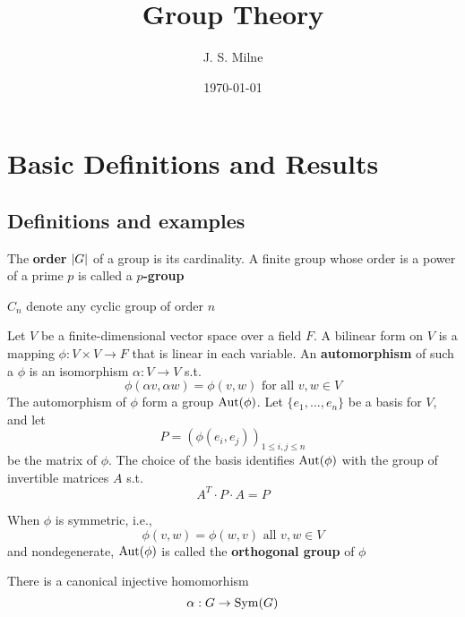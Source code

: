 \documentclass[11pt]{article}
\author{J. S. Milne}
\date{\today}
\title{Group Theory}
\begin{document}
\maketitle
\tableofcontents

\section{Basic Definitions and Results}
\label{sec:org7e895c4}
\subsection{Definitions and examples}
\label{sec:orgc0d5906}
The \textbf{order} \(\abs{G}\) of a group is its cardinality. A finite group whose order is a power of a
prime \(p\) is called a \textbf{\(p\)-group}

\(C_n\) denote any cyclic group of order \(n\)

\begin{examplle}[]
Let \(V\) be a finite-dimensional vector space over a field \(F\). A bilinear form on \(V\) is a
mapping \(\phi:V\times V\to F\) that is linear in each variable. An \textbf{automorphism} of such a \(\phi\) is an
isomorphism \(\alpha:V\to V\) s.t.
\begin{equation*}
\phi(\alpha v,\alpha w)=\phi(v,w)\text{ for all }v,w\in V
\end{equation*}
The automorphism of \(\phi\) form a group \(\operatorname{\text{Aut}}(\phi)\). Let \(\{e_1,\dots,e_n\}\) be a basis for \(V\), and let
\begin{equation*}
P=(\phi(e_i,e_j))_{1\le i,j\le n}
\end{equation*}
be the matrix of \(\phi\). The choice of the basis identifies \(\operatorname{\text{Aut}}(\phi)\) with the group of invertible
matrices \(A\) s.t.
\begin{equation*}
A^T\cdot P\cdot A=P
\end{equation*}

When \(\phi\) is symmetric, i.e.,
\begin{equation*}
\phi(v,w)=\phi(w,v)\text{ all }v,w\in V
\end{equation*}
and nondegenerate, \(\operatorname{\text{Aut}}(\phi)\) is called the \textbf{orthogonal group} of \(\phi\)
\end{examplle}

\begin{theorem}[Cayley]
There is a canonical injective homomorhism
\begin{equation*}
\alpha:G\to\operatorname{Sym}(G)
\end{equation*}
\end{theorem}
\end{document}
